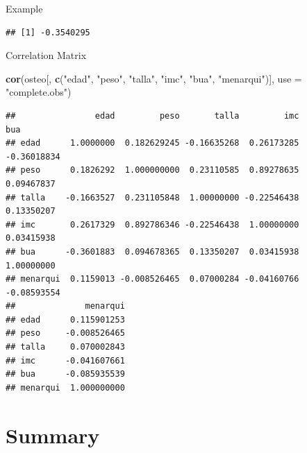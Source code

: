 \documentclass[
  ignorenonframetext,
]{beamer}
\newenvironment{Shaded}{\begin{snugshade}}{\end{snugshade}}
\newcommand{\AttributeTok}[1]{\textcolor[rgb]{0.13,0.29,0.53}{#1}}
\newcommand{\FunctionTok}[1]{\textcolor[rgb]{0.13,0.29,0.53}{\textbf{#1}}}
\newcommand{\NormalTok}[1]{#1}
\newcommand{\SpecialCharTok}[1]{\textcolor[rgb]{0.81,0.36,0.00}{\textbf{#1}}}
\newcommand{\StringTok}[1]{\textcolor[rgb]{0.31,0.60,0.02}{#1}}
\begin{document}
\begin{frame}[fragile]{Example}
\label{example}
\begin{Shaded}
\end{Shaded}

\begin{verbatim}
## [1] -0.3540295
\end{verbatim}
\end{frame}

\begin{frame}[fragile]{Correlation Matrix}
\label{correlation-matrix}
\begin{Shaded}
\begin{Highlighting}[]
\FunctionTok{cor}\NormalTok{(osteo[, }\FunctionTok{c}\NormalTok{(}\StringTok{"edad"}\NormalTok{, }\StringTok{"peso"}\NormalTok{, }\StringTok{"talla"}\NormalTok{, }\StringTok{"imc"}\NormalTok{, }\StringTok{"bua"}\NormalTok{, }\StringTok{"menarqui"}\NormalTok{)], }\AttributeTok{use =} \StringTok{"complete.obs"}\NormalTok{)}
\end{Highlighting}
\end{Shaded}

\begin{verbatim}
##                edad         peso       talla         imc         bua
## edad      1.0000000  0.182629245 -0.16635268  0.26173285 -0.36018834
## peso      0.1826292  1.000000000  0.23110585  0.89278635  0.09467837
## talla    -0.1663527  0.231105848  1.00000000 -0.22546438  0.13350207
## imc       0.2617329  0.892786346 -0.22546438  1.00000000  0.03415938
## bua      -0.3601883  0.094678365  0.13350207  0.03415938  1.00000000
## menarqui  0.1159013 -0.008526465  0.07000284 -0.04160766 -0.08593554
##              menarqui
## edad      0.115901253
## peso     -0.008526465
## talla     0.070002843
## imc      -0.041607661
## bua      -0.085935539
## menarqui  1.000000000
\end{verbatim}
\end{frame}

\section{Summary}\label{summary}
\end{document}
